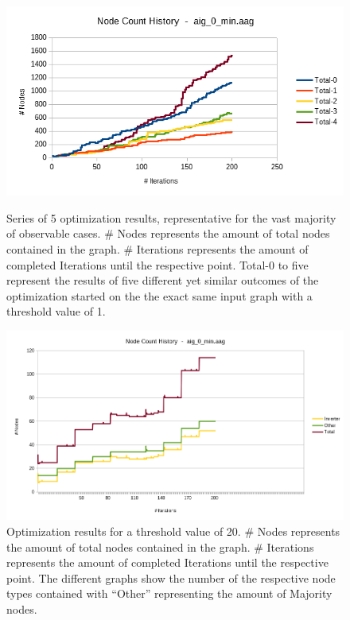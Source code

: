 \documentclass[
	accentcolor=1c,%
	type=intern,
	marginpar=false,
	ruledheaders=section,
	class=report,
	BCOR=5mm,
      parskip=half-,
	fontsize=10pt
	]{tudapub}
\begin{document}
			\begin{figure}[!ht]
				\begin{minipage}{\textwidth}
					\centering
					\begin{minipage}{.45\textwidth}
						\includegraphics[width=\textwidth]{images/eval_4.png}
						\caption{Series of 5 optimization results, representative for the vast majority of observable cases. \# Nodes represents the amount of total nodes contained in the graph. \# Iterations represents the amount of completed Iterations until the respective point. Total-0 to five represent the results of five different yet similar outcomes of the optimization started on the the exact same input graph with a threshold value of 1.}
						\label{fig_4}
					\end{minipage} \quad
					\begin{minipage}{.45\textwidth}
						\includegraphics[width=\textwidth]{images/eval_5.png}
						\caption{Optimization results for a threshold value of 20. \# Nodes represents the amount of total nodes contained in the graph. \# Iterations represents the amount of completed Iterations until the respective point. The different graphs show the number of the respective node types contained with ``Other'' representing the amount of Majority nodes.}

\end{minipage}
\end{minipage}
\end{figure}
\end{document}
